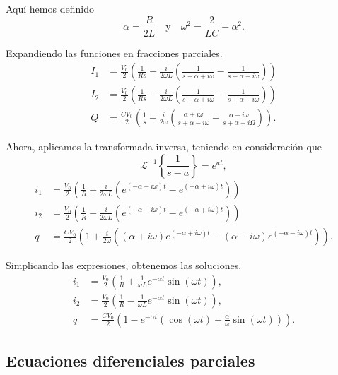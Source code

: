 \begin{ejemplo}
    Aquí hemos definido
    $$\alpha = \frac{R}{2L} \quad \text{y} \quad \omega^2 = \frac{2}{LC} - \alpha^2.$$

    Expandiendo las funciones en fracciones parciales.
    \begin{align*}
        I_1 &= \frac{V_0}{2} \left(\frac{1}{Rs} + \frac{i}{2\omega L} \left(\frac{1}{s+\alpha + i\omega} - \frac{1}{s+\alpha - i\omega} \right) \right) \\
        I_2 &= \frac{V_0}{2} \left(\frac{1}{Rs} - \frac{i}{2\omega L} \left(\frac{1}{s+\alpha + i\omega} - \frac{1}{s+\alpha - i\omega} \right) \right) \\
        Q &= \frac{C V_0}{2} \left( \frac{1}{s} + \frac{i}{2\omega} \left( \frac{\alpha + i\omega}{s+\alpha - i\omega} - \frac{\alpha - i \omega}{s+\alpha +i\Omega} \right) \right).
    \end{align*}

    Ahora, aplicamos la transformada inversa, teniendo en consideración que
    $$\mathcal{L}^{-1}\left\{ \frac{1}{s-a} \right\} = e^{at},$$
     \begin{align*}
        i_1 &= \frac{V_0}{2} \left(\frac{1}{R} + \frac{i}{2\omega L} \left( e^{(-\alpha - i\omega)t} - e^{(-\alpha + i\omega)t}\right) \right) \\
        i_2 &= \frac{V_0}{2} \left(\frac{1}{R} - \frac{i}{2\omega L} \left( e^{(-\alpha - i\omega)t} - e^{(-\alpha + i \omega)t}\right) \right) \\
        q &= \frac{C V_0}{2} \left( 1 + \frac{i}{2\omega} \left( (\alpha + i\omega) e^{(-\alpha + i \omega)t} - (\alpha - i\omega)e^{(-\alpha - i\omega)t} \right) \right).
    \end{align*}

    Simplicando las expresiones, obtenemos las soluciones.
    \begin{align*}
        i_1 &= \frac{V_0}{2} \left(\frac{1}{R} + \frac{1}{\omega L} e^{-\alpha t}\sin(\omega t) \right), \\
        i_2 &= \frac{V_0}{2} \left(\frac{1}{R} - \frac{1}{\omega L} e^{-\alpha t}\sin(\omega t) \right), \\
        q &= \frac{CV_0}{2} \left( 1- e^{-\alpha t} \left( \cos(\omega t) + \frac{\alpha}{\omega} \sin(\omega t) \right)\right).
    \end{align*}
\end{ejemplo}



\subsection{Ecuaciones diferenciales parciales}

